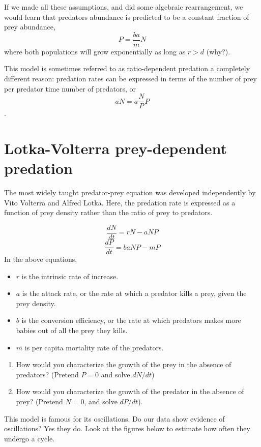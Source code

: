 \documentclass[
  letterpaper,
  DIV=11,
  numbers=noendperiod]{scrreprt}
\providecommand{\tightlist}{%
  \setlength{\itemsep}{0pt}\setlength{\parskip}{0pt}}
\begin{document}
If we made all these assumptions, and did some algebraic rearrangement,
we would learn that predators abundance is predicted to be a constant
fraction of prey abundance, \[P = \frac{ba}{m}N\] where both populations
will grow exponentially as long as \(r>d\) (why?).

This model is sometimes referred to as ratio-dependent predation a
completely different reason: predation rates can be expressed in terms
of the number of prey per predator time number of predators, or
\[aN = a\frac{N}{P}P\] .

\section{Lotka-Volterra prey-dependent
predation}\label{lotka-volterra-prey-dependent-predation}

The most widely taught predator-prey equation was developed
independently by Vito Volterra and Alfred Lotka. Here, the predation
rate is expressed as a function of prey density rather than the ratio of
prey to predators.

\[\frac{dN}{dt} = rN-aNP\] \[\frac{dP}{dt} = baNP  -mP\] In the above
equations,

\begin{itemize}
\tightlist
\item
  \(r\) is the intrinsic rate of increase.
\item
  \(a\) is the attack rate, or the rate at which a predator kills a
  prey, given the prey density.
\item
  \(b\) is the conversion efficiency, or the rate at which predators
  makes more babies out of all the prey they kills.
\item
  \(m\) is per capita mortality rate of the predators.
\end{itemize}

\begin{enumerate}
\def\labelenumi{\arabic{enumi}.}
\tightlist
\item
  How would you characterize the growth of the prey in the absence of
  predators? (Pretend \(P=0\) and solve \(dN/dt\))
\item
  How would you characterize the growth of the predator in the absence
  of prey? (Pretend \(N=0\), and solve \(dP/dt\)).
\end{enumerate}

This model is famous for its oscillations. Do our data show evidence of
oscillations? Yes they do. Look at the figures below to estimate how
often they undergo a cycle.
\end{document}
